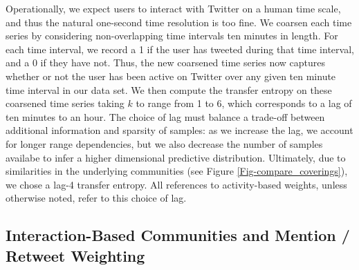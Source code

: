 Operationally, we expect users to interact with Twitter on a human time scale, and thus the natural one-second time resolution is too fine. We coarsen each time series by considering non-overlapping time intervals ten minutes in length. For each time interval, we record a 1 if the user has tweeted during that time interval, and a 0 if they have not. Thus, the new coarsened time series now captures whether or not the user has been active on Twitter over any given ten minute time interval in our data set. We then compute the transfer entropy on these coarsened time series taking $k$ to range from 1 to 6, which corresponds to a lag of ten minutes to an hour. The choice of lag must balance a trade-off between additional information and sparsity of samples: as we increase the lag, we account for longer range dependencies, but we also decrease the number of samples availabe to infer a higher dimensional predictive distribution. Ultimately, due to similarities in the underlying communities (see Figure \ref{Fig-compare_coverings}), we chose a lag-4 transfer entropy. All references to activity-based weights, unless otherwise noted, refer to this choice of lag.

\subsection{Interaction-Based Communities and Mention / Retweet Weighting}
\label{sec:method-interaction}

